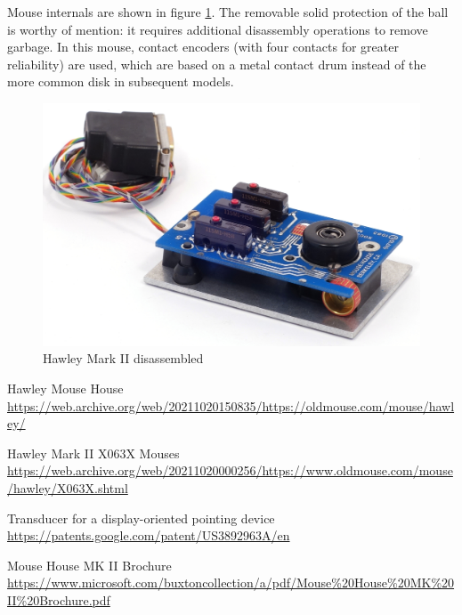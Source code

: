 \documentclass[11pt, a4paper]{article}
\begin{document}
Mouse internals are shown in figure \ref{fig:HawleyMarkIIInside}. The removable solid protection of the ball is worthy of mention: it requires additional disassembly operations to remove garbage. In this mouse, contact encoders (with four contacts for greater reliability) are used, which are based on a metal contact drum instead of the more common disk in subsequent models.

 \begin{figure}[h]
    \centering
    \includegraphics[scale=0.8]{1983_hawley_mark_ii/inside_60.jpg}
    \caption{Hawley Mark II disassembled}
    \label{fig:HawleyMarkIIInside}
\end{figure}

\begin{thebibliography}{9}
 Hawley Mouse House \url{https://web.archive.org/web/20211020150835/https://oldmouse.com/mouse/hawley/}

 Hawley Mark II X063X Mouses \url{https://web.archive.org/web/20211020000256/https://www.oldmouse.com/mouse/hawley/X063X.shtml}

 Transducer for a display-oriented pointing device \url{https://patents.google.com/patent/US3892963A/en}

 Mouse House MK II Brochure \url{https://www.microsoft.com/buxtoncollection/a/pdf/Mouse%20House%20MK%20II%20Brochure.pdf}
\end{thebibliography}
\end{document}
